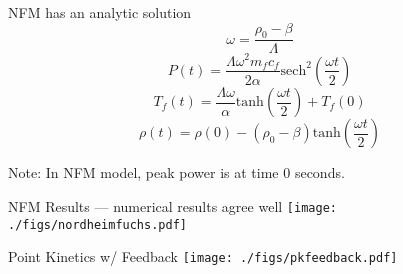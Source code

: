\documentclass[serif]{beamer}
\begin{document}
\begin{frame}{NFM has an analytic solution}
  \begin{equation}
    \nonumber
    \omega = \frac{\rho_0 - \beta}{\Lambda}
    \end{equation}
\vfill
  \begin{equation}
    \nonumber
    P\left(t\right) = \frac{\Lambda\omega^2m_fc_f}{2\alpha}\mathrm{sech}^2\left(\frac{\omega t}{2}\right)
  \end{equation}
\vfill
  \begin{equation}
    \nonumber
    T_f\left(t\right) = \frac{\Lambda\omega}{\alpha}\mathrm{tanh}\left(\frac{\omega t}{2}\right) + T_f\left(0\right)
  \end{equation}
\vfill
  \begin{equation}
    \nonumber
    \rho\left(t\right) = \rho\left(0\right) - \left(\rho_0 - \beta\right)\mathrm{tanh}\left(\frac{\omega t}{2}\right)
  \end{equation}
\vfill
  \begin{center}
    \alert{Note:} In NFM model, peak power is at time 0 seconds.
  \end{center}
\end{frame}

\begin{frame}{NFM Results --- numerical results agree well}
  \texttt{[image: ./figs/nordheimfuchs.pdf]}
\end{frame}

\begin{frame}{Point Kinetics w/ Feedback}
  \texttt{[image: ./figs/pkfeedback.pdf]}
\end{frame}

\end{document}
